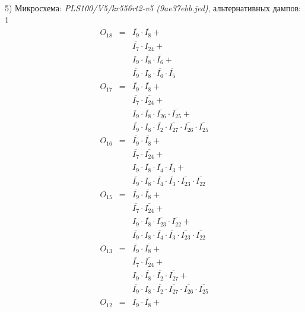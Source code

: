 \documentclass[a4paper,russian]{report}
\begin{document}
5) Микросхема: \emph{PLS100/V5/kr556rt2-v5  (9ae37ebb.jed)}, альтернативных дампов: 1
\nopagebreak\begin{eqnarray*}
    O_{18} & = & \overline{I_{9}} \cdotp \overline{I_{8}} + \\
	& &  \overline{I_{7}} \cdotp I_{24} + \\
	& &  I_{9} \cdotp \overline{I_{8}} \cdotp \overline{I_{6}} + \\
	& &  \overline{I_{9}} \cdotp I_{8} \cdotp \overline{I_{6}} \cdotp \overline{I_{5}} \\
    O_{17} & = & \overline{I_{9}} \cdotp \overline{I_{8}} + \\
	& &  \overline{I_{7}} \cdotp \overline{I_{24}} + \\
	& &  I_{9} \cdotp \overline{I_{8}} \cdotp \overline{I_{26}} \cdotp \overline{I_{25}} + \\
	& &  \overline{I_{9}} \cdotp I_{8} \cdotp \overline{I_{2}} \cdotp \overline{I_{27}} \cdotp \overline{I_{26}} \cdotp \overline{I_{25}} \\
    O_{16} & = & \overline{I_{9}} \cdotp \overline{I_{8}} + \\
	& &  \overline{I_{7}} \cdotp \overline{I_{24}} + \\
	& &  I_{9} \cdotp \overline{I_{8}} \cdotp \overline{I_{4}} \cdotp \overline{I_{3}} + \\
	& &  \overline{I_{9}} \cdotp I_{8} \cdotp \overline{I_{4}} \cdotp \overline{I_{3}} \cdotp \overline{I_{23}} \cdotp \overline{I_{22}} \\
    O_{15} & = & \overline{I_{9}} \cdotp \overline{I_{8}} + \\
	& &  \overline{I_{7}} \cdotp \overline{I_{24}} + \\
	& &  I_{9} \cdotp \overline{I_{8}} \cdotp \overline{I_{23}} \cdotp \overline{I_{22}} + \\
	& &  \overline{I_{9}} \cdotp I_{8} \cdotp \overline{I_{4}} \cdotp \overline{I_{3}} \cdotp \overline{I_{23}} \cdotp \overline{I_{22}} \\
    O_{13} & = & \overline{I_{9}} \cdotp \overline{I_{8}} + \\
	& &  \overline{I_{7}} \cdotp \overline{I_{24}} + \\
	& &  I_{9} \cdotp \overline{I_{8}} \cdotp \overline{I_{2}} \cdotp \overline{I_{27}} + \\
	& &  \overline{I_{9}} \cdotp I_{8} \cdotp \overline{I_{2}} \cdotp \overline{I_{27}} \cdotp \overline{I_{26}} \cdotp \overline{I_{25}} \\
    O_{12} & = & \overline{I_{9}} \cdotp \overline{I_{8}} + \\

\end{eqnarray*}
\end{document}

